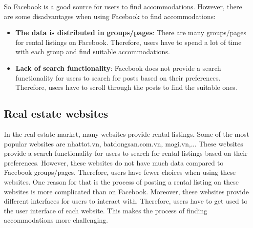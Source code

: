 \noindent So Facebook is a good source for users to find accommodations. However, there are some disadvantages when using Facebook to find accommodations:
\begin{itemize}
    \item \textbf{The data is distributed in groups/pages}: There are many groups/pages for rental listings on Facebook. Therefore, users have to spend a lot of time with each group and find suitable accommodations.
    \item \textbf{Lack of search functionality}: Facebook does not provide a search functionality for users to search for posts based on their preferences. Therefore, users have to scroll through the posts to find the suitable ones.
\end{itemize}

\subsection{Real estate websites}
In the real estate market, many websites provide rental listings. Some of the most popular websites are nhattot.vn, batdongsan.com.vn, mogi.vn,... These websites provide a search functionality for users to search for rental listings based on their preferences. However, these websites do not have much data compared to Facebook groups/pages. Therefore, users have fewer choices when using these websites. One reason for that is the process of posting a rental listing on these websites is more complicated than on Facebook. Moreover, these websites provide different interfaces for users to interact with. Therefore, users have to get used to the user interface of each website. This makes the process of finding accommodations more challenging.


